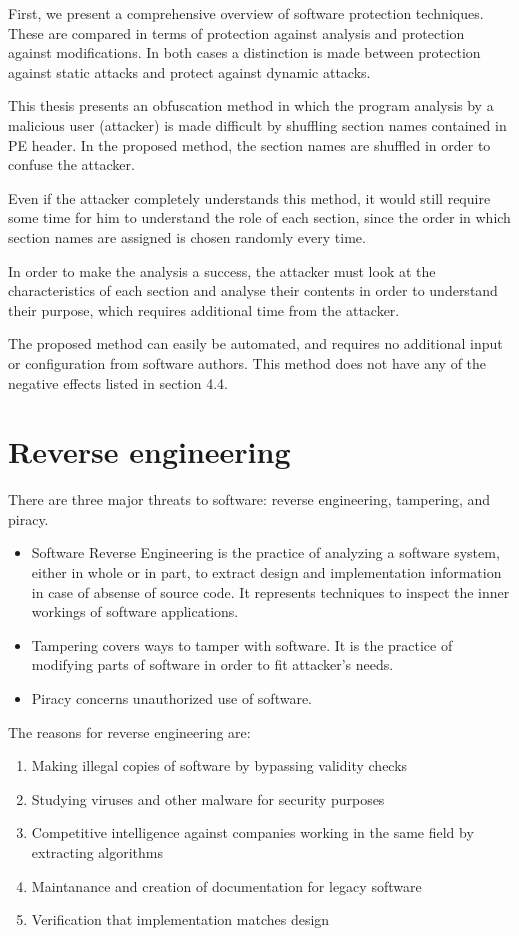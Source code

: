 \documentclass[a4paper,12pt]{article}
\begin{document}
First, we present a comprehensive overview of software protection techniques.
These are compared in terms of protection against analysis and protection
against modifications. In both cases a distinction is made between protection
against static attacks and protect against dynamic attacks.

This thesis presents an obfuscation method in which the program analysis by a
malicious user (attacker) is made difficult by shuffling section names
contained in PE header. In the proposed method, the section names are shuffled
in order to confuse the attacker.

Even if the attacker completely understands this method, it would still require
some time for him to understand the role of each section, since the order in
which section names are assigned is chosen randomly every time.

In order to make the analysis a success, the attacker must look at the
characteristics of each section and analyse their contents in order to
understand their purpose, which requires additional time from the attacker.

The proposed method can easily be automated, and requires no additional input
or configuration from software authors. This method does not have any of the
negative effects listed in section 4.4.

\section{Reverse engineering}

There are three major threats to software: reverse engineering, tampering, and
piracy.

\begin{itemize}
\item Software Reverse Engineering is the practice of analyzing a software 
    system, either in whole or in part, to extract design and implementation
    information in case of absense of source code. It represents techniques to
    inspect the inner workings of software applications.
\item Tampering covers ways to tamper with software. It is the practice of
    modifying parts of software in order to fit attacker's needs.
\item Piracy concerns unauthorized use of software.
\end{itemize}

The reasons for reverse engineering are:
\begin{enumerate}
\item Making illegal copies of software by bypassing validity checks
\item Studying viruses and other malware for security purposes
\item Competitive intelligence against companies working in the same field
    by extracting algorithms
\item Maintanance and creation of documentation for legacy software
\item Verification that implementation matches design 
\end{enumerate}
\end{document}
